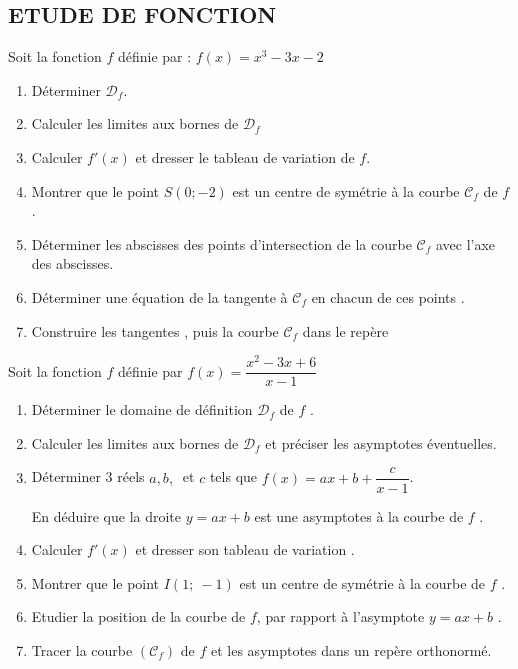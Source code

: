 \subsection*{ETUDE DE FONCTION}
\begin{exercice}
 Soit la fonction  $f$ d\'efinie par : $f(x)=x^3-3x-2 $ 
\begin{enumerate}
 \item D\'eterminer $\mathscr{D}_f$.
 \item Calculer les limites aux bornes de $\mathscr{D}_f$
 \item Calculer $f'(x)$ et dresser le tableau de variation de $f$.
 \item Montrer que le point $S(0;-2)$ est un centre de sym\'etrie \`a la courbe  $\mathscr{C}_f$ de $f$ .
\item D\'eterminer les abscisses des points d'intersection de la courbe $\mathscr{C}_f$ avec l'axe des abscisses.
  \item D\'eterminer une \'equation de la tangente \`a $\mathscr{C}_f$ en chacun de ces points .
  \item Construire les tangentes , puis la courbe $\mathscr{C}_f$ dans le rep\`ere
\end{enumerate}
\end{exercice}
\begin{exercice}
 Soit la fonction $f$ d\'efinie par $f(x)=\dfrac{x^2-3x+6}{x-1}$
\begin{enumerate}
 \item Déterminer le domaine de d\'efinition $\mathscr{D}_f$ de $f$ .
 \item Calculer les limites aux bornes de $\mathscr{D}_f$ et pr\'eciser les asymptotes \'eventuelles. 
 \item Déterminer 3 r\'eels $a,b,~$ et $c$ tels que $f(x)=ax+b+\dfrac{c}{x-1}$. 
 
 En d\'eduire que la droite 
 $y=ax+b$ est une asymptotes \`a la courbe de $f$ .
 \item Calculer $f'(x)$ et dresser son tableau de variation .
 \item Montrer que le point $I(1;~-1)$ est un centre de sym\'etrie \`a la courbe de $f$ .
 \item Etudier la position de la courbe de $f$, par rapport \`a l'asymptote $y=ax+b$ .
 \item Tracer la courbe $(\mathscr{C}_f)$ de $f$ et les asymptotes dans un rep\`ere orthonorm\'e. 
\end{enumerate}
\end{exercice}
